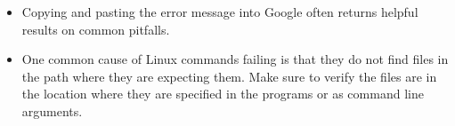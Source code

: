 \documentclass[landscape,a0paper,fontscale=0.285]{baposter} %
\newcommand{\compresslist}{ %
\setlength{\itemsep}{1pt}
\setlength{\parskip}{0pt}
\setlength{\parsep}{0pt}
}
\begin{document}
\begin{poster}
{\colorbox[HTML]{cdb87d}{}
\begin{itemize}\compresslist
\item Copying and pasting the error message into Google often returns helpful results on common pitfalls.
\item One common cause of Linux commands failing is that they do not find files
in the path where they are expecting them. Make sure to verify the files are in
the location where they are specified in the programs or as command line
arguments.
\end{itemize}
}
\end{poster}
\end{document}
